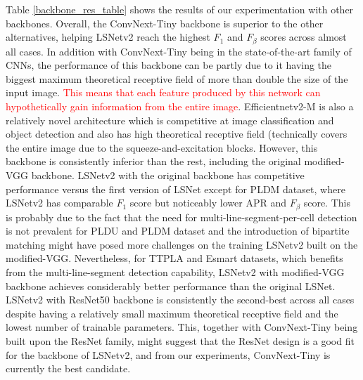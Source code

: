 \documentclass[journal]{IEEEtran}
\begin{document}
Table \ref{backbone_res_table} shows the results of our experimentation with other backbones. Overall, the ConvNext-Tiny backbone is superior to the other alternatives, helping LSNetv2 reach the highest $F_1$ and $F_\beta$ scores across almost all cases. In addition with ConvNext-Tiny being in the state-of-the-art family of CNNs, the performance of this backbone can be partly due to it having the biggest maximum theoretical receptive field of more than double the size of the input image. \textcolor{red}{This means that each feature produced by this network can hypothetically gain information from the entire image}. Efficientnetv2-M is also a relatively novel architecture which is competitive at image classification \cite{efficientnetv2} and object detection \cite{efficientdet} and also has high theoretical receptive field (technically covers the entire image due to the squeeze-and-excitation blocks. However, this backbone is consistently inferior than the rest, including the original modified-VGG backbone. LSNetv2 with the original backbone has competitive performance versus the first version of LSNet except for PLDM dataset, where LSNetv2 has comparable $F_1$ score but noticeably lower APR and $F_{\beta}$ score. This is probably due to the fact that the need for multi-line-segment-per-cell detection is not prevalent for PLDU and PLDM dataset and the introduction of bipartite matching might have posed more challenges on the training LSNetv2 built on the modified-VGG. Nevertheless, for TTPLA and Esmart datasets, which benefits from the multi-line-segment detection capability, LSNetv2 with modified-VGG backbone achieves considerably better performance than the original LSNet. LSNetv2 with ResNet50 backbone is consistently the second-best across all cases despite having a relatively small maximum theoretical receptive field and the lowest number of trainable parameters. This, together with ConvNext-Tiny being built upon the ResNet family, might suggest that the ResNet design is a good fit for the backbone of LSNetv2, and from our experiments, ConvNext-Tiny is currently the best candidate.
\end{document}
